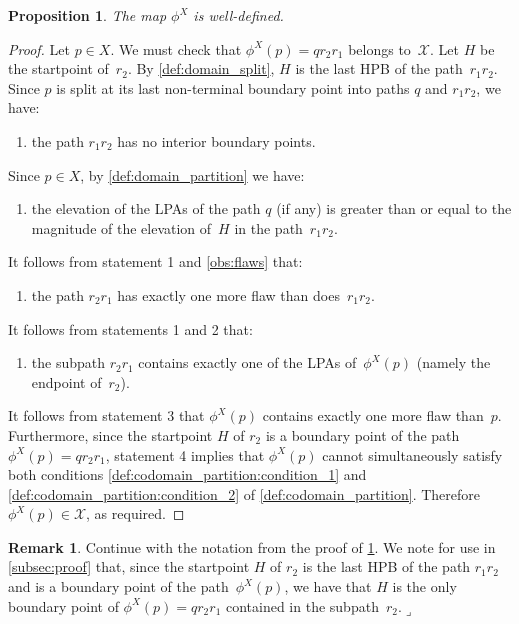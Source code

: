 \documentclass[11pt]{article}
\newcommand{\lrcornerqed}[0]{}
\renewcommand{\lrcornerqed}[0]{\hfill $\lrcorner$} %
\newtheorem{prop}[thm]{Proposition}
\theoremstyle{definition} %
\numberwithin{equation}{section}
\newtheorem{remark}[thm]{Remark}
\begin{document}
 \begin{prop} 
 \label{rem:codomain_phi_X}
 The map $\phi^X$ is well-defined.
 \end{prop}
 \begin{proof}
    Let $p\in X$. 
    We must check that 
    $\phi^X(p) = q r_2 r_1$ belongs to~$\mathcal{X}$.
    Let $H$ be the startpoint of~$r_2$.
    By \cref{def:domain_split}, $H$ is the last HPB of the path~$r_1 r_2$.
    Since $p$ is split at its last non-terminal boundary point into paths $q$ and $r_1 r_2$, we have:
    \begin{enumerate}
        \item 
        the path $r_1 r_2$ has no interior boundary points.
    \end{enumerate}
    Since $p \in X$, by \cref{def:domain_partition} we have:
    \begin{enumerate}
        \item[2.]
        the elevation of the LPAs of the path $q$ (if any) is greater than or equal to the magnitude of the elevation of~$H$ in the path~$r_1 r_2$.    
    \end{enumerate}

    It follows from statement 1 and \cref{obs:flaws} that:

    \begin{enumerate}
        \item[3.]
        the path $r_2 r_1$ has exactly one more flaw than does~$r_1 r_2$.
    \end{enumerate}

    It follows from statements 1 and 2 that:
    \begin{enumerate}
        \item[4.] 
        the subpath $r_2 r_1$ contains exactly one of the LPAs of~$\phi^X(p)$ (namely the endpoint of~$r_2$).
    \end{enumerate}

    It follows from statement 3 that $\phi^X(p)$ contains exactly one more flaw than~$p$. Furthermore, since the startpoint $H$ of $r_2$ is a boundary point of the path $\phi^X(p) = q r_2 r_1$, statement 4 implies that $\phi^X(p)$ cannot simultaneously satisfy both conditions \ref{def:codomain_partition:condition_1} and \ref{def:codomain_partition:condition_2} of \cref{def:codomain_partition}. Therefore $\phi^X(p) \in \mathcal{X}$, as required.
\end{proof}


\begin{remark}
\label{rem:remark_after_phi_X_well-defined}
    Continue with the notation from the proof of \cref{rem:codomain_phi_X}.
    We note for use in \cref{subsec:proof} that, since the startpoint $H$ of $r_2$ is the last HPB of the path $r_1r_2$ and is a boundary point of the path~$\phi^X(p)$, we have that $H$ is the only boundary point of $\phi^X(p) = qr_2r_1$ contained in the subpath~$r_2$.\lrcornerqed
\end{remark}
\end{document}
